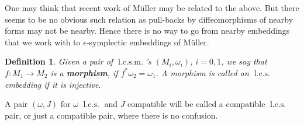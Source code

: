 \documentclass{amsart}
\numberwithin{equation}{section}
\newtheorem{theorem}{Theorem}
\newtheorem{definition}[equation]{Definition}
\theoremstyle{definition}
\theoremstyle{remark}
\newtheorem{remark}{Remark}
\DeclareMathOperator{\lcs}{l.c.s.}
\DeclareMathOperator{\lcsm}{l.c.s.m.}
\begin{document}
One may think that recent work of M\"uller \cite{citeMuller} may be related to the above. But there seems to be no obvious such relation as pull-backs by diffeomorphisms of nearby forms may not be nearby. Hence there is no way to go from nearby embeddings that we work with to $\epsilon$-symplectic embeddings of M\"uller.
\begin{definition}
   Given a pair of $\lcsm$'s $(M _{i}, \omega _{i} )$,
   $i=0,1$, we say that $f: M _{1} \to M _{2}  $ is a \textbf{\emph{morphism}}, if 
   $f^{*} \omega _{2} = \omega _{1}$. A morphism is called an $\lcs$ embedding if it is injective.
\end{definition}
A pair $(\omega,J)$ for $\omega$ $\lcs$ and $J$ compatible will be called a compatible $\lcs$ pair, or just a compatible pair, where there is no confusion.
\end{document}
